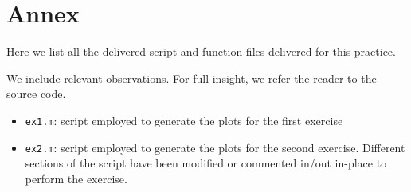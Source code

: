 \section{Annex}

Here we list all the delivered script and function files delivered for this practice.

We include relevant observations. For full insight, we refer the reader to the
source code.

\begin{itemize}
	\item \texttt{ex1.m}: script employed to generate the plots for the first exercise
	\item \texttt{ex2.m}: script employed to generate the plots for the second exercise. Different sections of the script have been modified or commented in/out in-place to perform the exercise.
\end{itemize}

